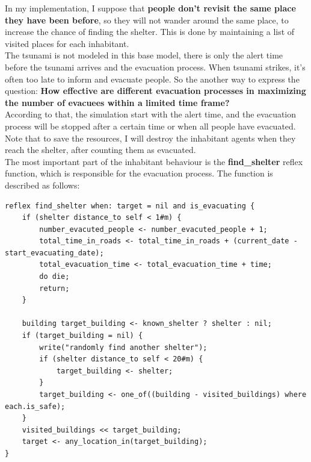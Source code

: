 \documentclass[12pt]{article}
\begin{document}
In my implementation, I suppose that \textbf{people don't revisit the same place they have been before}, so they will not wander around the same place, to increase the chance of finding the shelter. This is done by maintaining a list of visited places for each inhabitant. \\

The tsunami is not modeled in this base model, there is only the alert time before the tsunami arrives and the evacuation process. When tsunami strikes, it's often too late to inform and evacuate people. So the another way to express the question: \textbf{How effective are different evacuation processes in maximizing the number of evacuees within a limited time frame?} \\

According to that, the simulation start with the alert time, and the evacuation process will be stopped after a certain time or when all people have evacuated. \\

Note that to save the resources, I will destroy the inhabitant agents when they reach the shelter, after counting them as evacuated. \\

The most important part of the inhabitant behaviour is the \textbf{find\_shelter} reflex function, which is responsible for the evacuation process. The function is described as follows:

\begin{codebox}
\begin{lstlisting}[style=GAML]
reflex find_shelter when: target = nil and is_evacuating {
    if (shelter distance_to self < 1#m) {
        number_evacuted_people <- number_evacuted_people + 1;
        total_time_in_roads <- total_time_in_roads + (current_date - start_evacuating_date);
        total_evacuation_time <- total_evacuation_time + time;
        do die;
        return;
    }
    
    building target_building <- known_shelter ? shelter : nil;
    if (target_building = nil) {
        write("randomly find another shelter");
        if (shelter distance_to self < 20#m) {
            target_building <- shelter;
        }
        target_building <- one_of((building - visited_buildings) where each.is_safe);
    }
    visited_buildings << target_building;
    target <- any_location_in(target_building);
}
\end{lstlisting}
\end{codebox}
\end{document}
